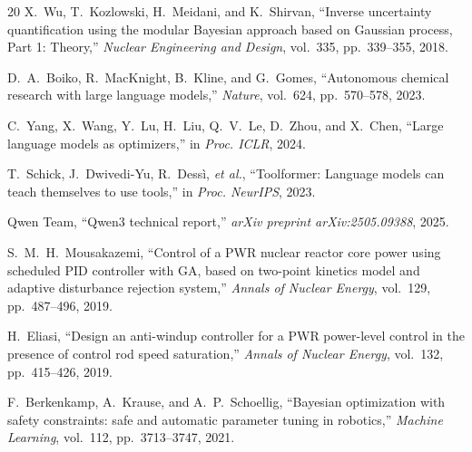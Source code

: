 \documentclass[11pt,twocolumn]{article}
\begin{document}
\begin{thebibliography}{20}
X.~Wu, T.~Kozlowski, H.~Meidani, and K.~Shirvan,
``Inverse uncertainty quantification using the modular {Bayesian} approach based on {Gaussian} process, Part 1: Theory,''
\emph{Nuclear Engineering and Design}, vol.~335, pp.~339--355, 2018.

D.~A.~Boiko, R.~MacKnight, B.~Kline, and G.~Gomes,
``Autonomous chemical research with large language models,''
\emph{Nature}, vol.~624, pp.~570--578, 2023.

C.~Yang, X.~Wang, Y.~Lu, H.~Liu, Q.~V.~Le, D.~Zhou, and X.~Chen,
``Large language models as optimizers,''
in \emph{Proc. ICLR}, 2024.

T.~Schick, J.~Dwivedi-Yu, R.~Dess\`{i}, \emph{et al.},
``Toolformer: Language models can teach themselves to use tools,''
in \emph{Proc. NeurIPS}, 2023.

Qwen Team,
``Qwen3 technical report,''
\emph{arXiv preprint arXiv:2505.09388}, 2025.

S.~M.~H.~Mousakazemi,
``Control of a {PWR} nuclear reactor core power using scheduled {PID} controller with {GA}, based on two-point kinetics model and adaptive disturbance rejection system,''
\emph{Annals of Nuclear Energy}, vol.~129, pp.~487--496, 2019.

H.~Eliasi,
``Design an anti-windup controller for a {PWR} power-level control in the presence of control rod speed saturation,''
\emph{Annals of Nuclear Energy}, vol.~132, pp.~415--426, 2019.

F.~Berkenkamp, A.~Krause, and A.~P.~Schoellig,
``{Bayesian} optimization with safety constraints: safe and automatic parameter tuning in robotics,''
\emph{Machine Learning}, vol.~112, pp.~3713--3747, 2021.

\end{thebibliography}
\end{document}
